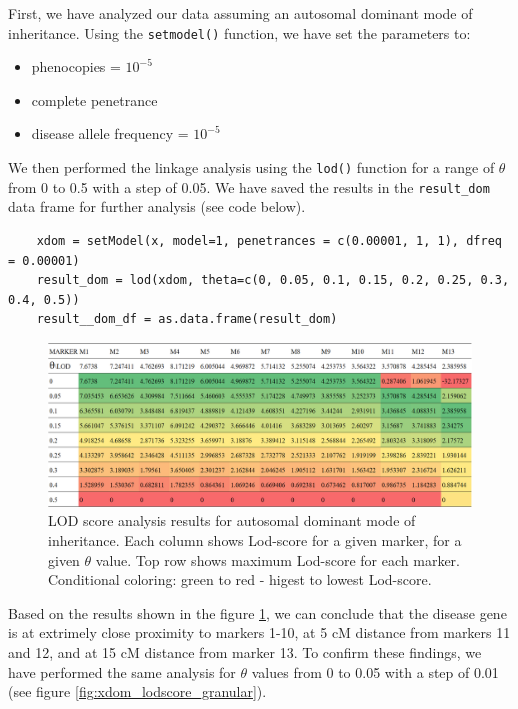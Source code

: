 \documentclass[a4paper,12pt]{article}
\begin{document}
First, we have analyzed our data assuming an autosomal dominant mode of inheritance. Using the \texttt{setmodel()} function,
we have set the parameters to:
\begin{itemize}
    \item phenocopies = $10^{-5}$
    \item complete penetrance
    \item disease allele frequency = $10^{-5}$
\end{itemize}

We then performed the linkage analysis using the \texttt{lod()} function for a range of $\theta$ from 0 to 0.5 with a step of 0.05. 
We have saved the results in the \texttt{result\_dom} data frame for further analysis (see code below).

\begin{verbatim}
    xdom = setModel(x, model=1, penetrances = c(0.00001, 1, 1), dfreq = 0.00001)
    result_dom = lod(xdom, theta=c(0, 0.05, 0.1, 0.15, 0.2, 0.25, 0.3, 0.4, 0.5)) 
    result__dom_df = as.data.frame(result_dom)
\end{verbatim}

\begin{figure}[hb!] %
    \centering
    \includegraphics[width=\textwidth]{images/xdom_lod_analysis.png}
    \caption{LOD score analysis results for autosomal dominant mode of inheritance. Each column shows 
    Lod-score for a given marker, for a given $\theta$ value. Top row shows maximum Lod-score for each marker. 
    Conditional coloring: green to red - higest to lowest Lod-score.}   
    \label{fig:xdom_lodscore} 
    
\end{figure}

Based on the results shown in the figure \ref{fig:xdom_lodscore}, we can conclude that 
the disease gene is at extrimely close proximity to markers 1-10, at 5 cM distance 
from markers 11 and 12, and at 15 cM distance from marker 13. To confirm these findings, 
we have performed the same analysis for $\theta$ values from 0 to 0.05 with a step of 0.01 (see figure \ref{fig:xdom_lodscore_granular}).
\end{document}
